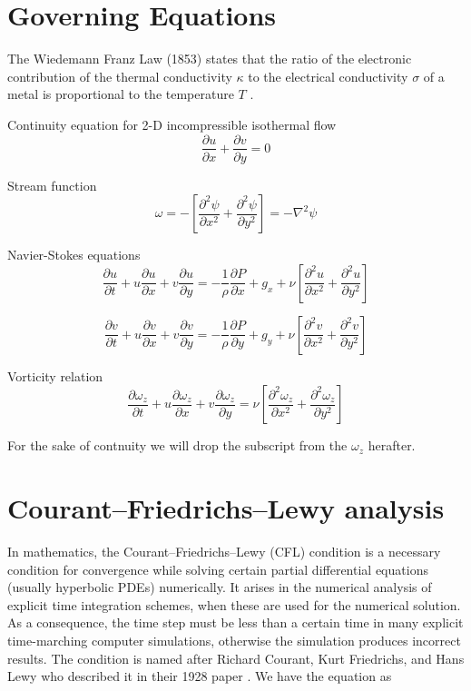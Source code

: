 \documentclass{article}
\begin{document}
\section{Governing Equations}
The Wiedemann Franz Law (1853) states that the ratio of the electronic contribution of the thermal conductivity $\kappa$ to the electrical conductivity $\sigma$ of a metal is proportional to the temperature $ T $ . \citep{Ashcroft}

Continuity equation for 2-D incompressible isothermal flow
\begin{equation}
\label{eqn:continuityEqn}
\frac{\partial u}{\partial x} + \frac{\partial v}{\partial y} = 0  
\end{equation}

Stream function 
\begin{equation}
\label{eqn:streamFnEqn}
\omega = -\left[\frac{\partial^2 \psi}{\partial x^2} +  \frac{\partial^2 \psi}{\partial y^2}\right]=-\nabla^2 \psi
\end{equation}

Navier-Stokes equations
\begin{equation}
\frac{\partial u}{\partial t} + u\frac{\partial u}{\partial x} + v\frac{\partial u}{\partial y}= -\frac{1}{\rho}\frac{\partial P}{\partial x} + g_x + \nu \left [ \frac{\partial^2 u}{\partial x^2} +  \frac{\partial^2 u}{\partial y^2} \right ]
\end{equation}

\begin{equation}
\frac{\partial v}{\partial t} + u\frac{\partial v}{\partial x} + v\frac{\partial v}{\partial y}= -\frac{1}{\rho}\frac{\partial P}{\partial y} + g_y + \nu \left [ \frac{\partial^2 v}{\partial x^2} +  \frac{\partial^2 v}{\partial y^2} \right ]
\end{equation}

Vorticity relation 
\begin{equation}
\label{eqn:vorticityFnEqn}
\frac{\partial \omega_z}{\partial t} + u\frac{\partial \omega_z}{\partial x} + v\frac{\partial \omega_z}{\partial y}= \nu \left [ \frac{\partial^2 \omega_z}{\partial x^2} +  \frac{\partial^2 \omega_z}{\partial y^2} \right ]
\end{equation}

For the sake of contnuity we will drop the subscript from the $\omega_z$ herafter.

\section{Courant–Friedrichs–Lewy analysis}
In mathematics, the Courant–Friedrichs–Lewy (CFL) condition is a necessary condition for convergence while solving certain partial differential equations (usually hyperbolic PDEs) numerically. It arises in the numerical analysis of explicit time integration schemes, when these are used for the numerical solution. As a consequence, the time step must be less than a certain time in many explicit time-marching computer simulations, otherwise the simulation produces incorrect results. The condition is named after Richard Courant, Kurt Friedrichs, and Hans Lewy who described it in their 1928 paper \citep{cfl}.
 We have the equation as 
\end{document}
